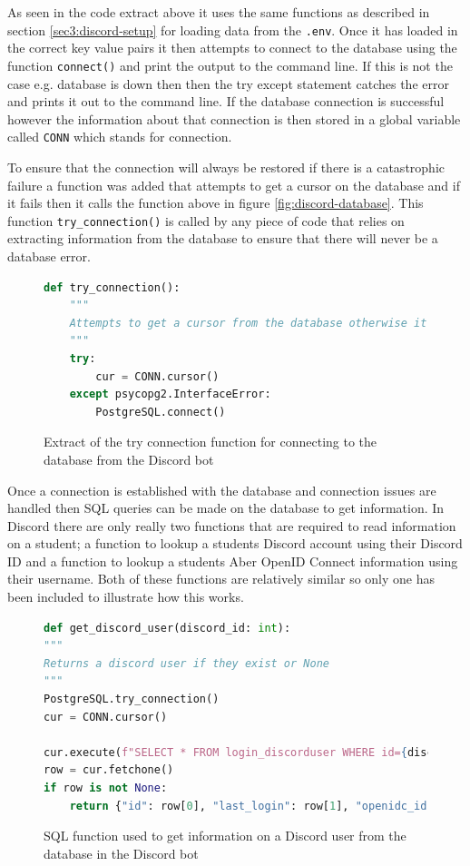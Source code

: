 As seen in the code extract above it uses the same functions as described in section \ref{sec3:discord-setup} for loading data from the \verb|.env|. Once it has loaded in the correct key value pairs it then attempts to connect to the database using the function \verb|connect()| and print the output to the command line. If this is not the case e.g. database is down then then the try except statement catches the error and prints it out to the command line. If the database connection is successful however the information about that connection is then stored in a global variable called \verb|CONN| which stands for connection.

To ensure that the connection will always be restored if there is a catastrophic failure a function was added that attempts to get a cursor on the database and if it fails then it calls the function above in figure \ref{fig:discord-database}. This function \verb|try_connection()| is called by any piece of code that relies on extracting information from the database to ensure that there will never be a database error.

\begin{figure}[H]
\begin{lstlisting}[language=Python]
def try_connection():
	"""
	Attempts to get a cursor from the database otherwise it restarts the database connection
	"""
	try:
		cur = CONN.cursor()
	except psycopg2.InterfaceError:
		PostgreSQL.connect()
\end{lstlisting}
\caption{Extract of the try connection function for connecting to the database from the Discord bot}
\label{fig:discord-database-try-connect}
\end{figure}

Once a connection is established with the database and connection issues are handled then SQL queries can be made on the database to get information. In Discord there are only really two functions that are required to read information on a student; a function to lookup a students Discord account using their Discord ID and a function to lookup a students Aber OpenID Connect information using their username. Both of these functions are relatively similar so only one has been included to illustrate how this works.

\begin{figure}[H]
\begin{lstlisting}[language=Python]
def get_discord_user(discord_id: int):
""" 
Returns a discord user if they exist or None
"""
PostgreSQL.try_connection()
cur = CONN.cursor()

cur.execute(f"SELECT * FROM login_discorduser WHERE id={discord_id}")
row = cur.fetchone()
if row is not None:
	return {"id": row[0], "last_login": row[1], "openidc_id": row[2]}
\end{lstlisting}
\caption{SQL function used to get information on a Discord user from the database in the Discord bot}
\label{fig:discord-database-sql-statement}
\end{figure}

